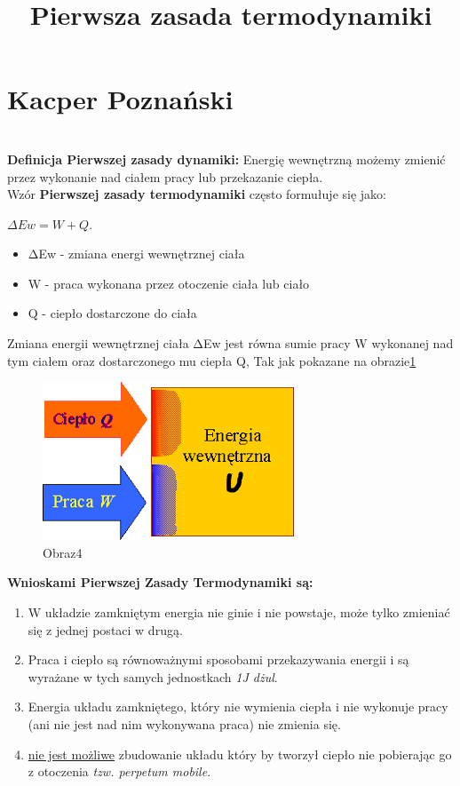 \section{Kacper Poznański}
\centering\title{\textbf{Pierwsza zasada termodynamiki}}
\\
\textbf{Definicja Pierwszej zasady dynamiki:} Energię wewnętrzną możemy zmienić przez wykonanie nad ciałem pracy lub przekazanie ciepła.
\\
Wzór \textbf{Pierwszej zasady termodynamiki} często formułuje się jako: 

\centering \(ΔEw = W + Q\).

\begin{itemize}
    \item ΔEw - zmiana energi wewnętrznej ciała
    \item W - praca wykonana przez otoczenie ciała lub ciało
    \item Q - ciepło dostarczone do ciała
\end{itemize}

Zmiana energii wewnętrznej ciała ΔEw jest równa sumie pracy W wykonanej nad tym ciałem oraz dostarczonego mu ciepła Q, Tak jak pokazane na obrazie\ref{fig1}
\begin{figure}[htbp]
    \centering
    \includegraphics[]{pictures/ciepl.png}
    \caption{Obraz4}
    \label{fig1}
\end{figure}

\textbf{Wnioskami Pierwszej Zasady Termodynamiki są:}

\begin{enumerate}
    \item W układzie zamkniętym energia nie ginie i nie powstaje, może tylko zmieniać się z jednej postaci w drugą.
    \item Praca i ciepło są równoważnymi sposobami przekazywania energii i są wyrażane w tych samych jednostkach \textit{1J dżul}.
    \item Energia układu zamkniętego, który nie wymienia ciepła i nie wykonuje pracy (ani nie jest nad nim wykonywana praca) nie zmienia się.
    \item \underline{nie jest możliwe} zbudowanie układu który by tworzył ciepło nie pobierając go z otoczenia \textit{tzw. perpetum mobile}.
\end{enumerate}




